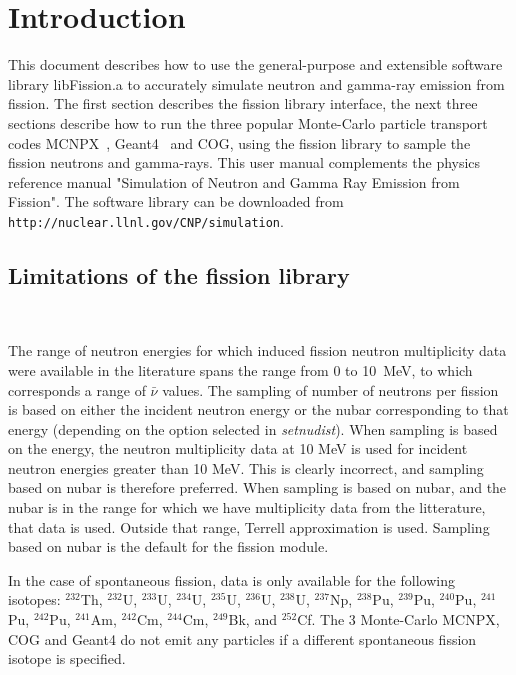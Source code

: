 \documentclass[fleqn,11pt]{article}
\date{February 23, 2007}
\author{
Fission Library Development Team\\
\\
Lawrence Livermore National Laboratory
}
\begin{document}
\maketitle

\section{Introduction}
This document describes how to use the general-purpose and
extensible software library libFission.a to accurately 
simulate neutron and gamma-ray emission from fission. The 
first section describes the fission library interface, the 
next three sections describe how to run the three popular 
Monte-Carlo particle transport codes MCNPX~\cite{MCNPX}, 
Geant4~\cite{Geant4} and COG, using the fission library to 
sample the fission neutrons and gamma-rays. This user 
manual complements the physics reference manual "Simulation
of Neutron and Gamma Ray Emission from Fission". The software
library can be downloaded from \\
{\tt http://nuclear.llnl.gov/CNP/simulation}.

\subsection{Limitations of the fission library}~\label{Limitations of the fission library}

The range of neutron energies for which induced fission neutron 
multiplicity data were available in the literature spans the range from 0 
to 10~MeV, to which corresponds a range of $\bar{\nu}$ values. The
sampling of number of neutrons per fission is based on either 
the incident neutron energy or the nubar corresponding to that 
energy (depending on the option selected in \textit{setnudist}). 
When sampling is based on the energy, the neutron multiplicity 
data at 10 MeV is used for incident neutron energies greater 
than 10 MeV. This is clearly incorrect, and sampling based on 
nubar is therefore preferred. When sampling is based on nubar, 
and the nubar is in the range for which we have multiplicity 
data from the litterature, that data is used. Outside that 
range, Terrell approximation is used. Sampling based on nubar 
is the default for the fission module.

In the case of spontaneous fission, data is only available 
for the following isotopes: $^{232}$Th, $^{232}$U, 
$^{233}$U, $^{234}$U, $^{235}$U, $^{236}$U, $^{238}$U, 
$^{237}$Np, $^{238}$Pu, $^{239}$Pu, $^{240}$Pu, $^{241}$Pu, 
$^{242}$Pu, $^{241}$Am, $^{242}$Cm, $^{244}$Cm, $^{249}$Bk, 
and $^{252}$Cf. The 3 Monte-Carlo MCNPX, COG and Geant4 do 
not emit any particles if a different spontaneous fission 
isotope is specified.
\end{document}

